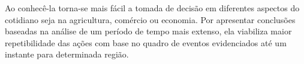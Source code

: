 \newpar Ao conhecê-la torna-se mais fácil a tomada de decisão em diferentes aspectos do cotidiano seja na agricultura, comércio ou economia. Por apresentar conclusões baseadas na análise de um período de tempo mais extenso, ela viabiliza maior repetibilidade das ações com base no quadro de eventos evidenciados até um instante para determinada região. 